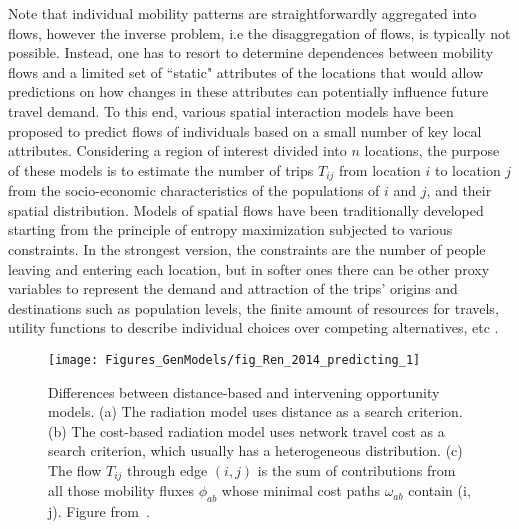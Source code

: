 Note that individual mobility patterns are straightforwardly aggregated into flows, however the inverse problem, i.e the disaggregation of flows, is typically not possible. Instead, one has to resort to determine dependences between mobility flows and a limited set of ``static" attributes of the locations that would allow predictions on how changes in these attributes can potentially influence future travel demand. To this end, various spatial interaction models have been proposed to predict flows of individuals based on a small number of key local attributes. Considering a region of interest divided into $n$ locations, the purpose of these models is to estimate the number of trips $T_{ij}$ from location $i$ to location $j$ from the socio-economic characteristics of the populations of $i$ and $j$, and their spatial distribution. Models of spatial flows have been traditionally developed starting from the principle of entropy maximization subjected to various constraints. In the strongest version, the constraints are the number of people leaving and entering each location, but in softer ones there can be other proxy variables to represent the demand and attraction of the trips' origins and destinations such as population levels, the finite amount of resources for travels, utility functions to describe individual choices over competing alternatives, etc \cite{wilson_1967_statistical,mcfadden_1974_measurement,benakiva_1985_discrete,sagarra_2013_statistical,sagarra_2015_role}. 


\begin{figure}[t!]
\centering
\texttt{[image: Figures\_GenModels/fig\_Ren\_2014\_predicting\_1]}
\caption{Differences between distance-based and intervening opportunity models. (a) The radiation model uses distance as a search criterion. (b) The cost-based radiation model uses network travel cost as a search criterion, which usually has a heterogeneous distribution. (c) The flow $T_{ij}$ through edge $(i, j)$ is the sum of contributions from all those mobility fluxes $\phi_{ab}$ whose minimal cost paths $\omega_{ab}$ contain (i, j). Figure from~\cite{ren_2014_predicting}.}
\label{fig:ren_2014_predicting}
\end{figure}


